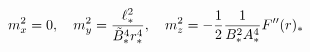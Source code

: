 \begin{equation}
m^{2}_{x}=0,\quad
m^{2}_{y}={\ell^{2}_{*}\over \tilde{B}^{4}_{*}r^{4}_{*}},\quad
m^{2}_{z}=-{1\over 2}{1\over B^{2}_{*}A^{4}_{*}}F''(r)_{*}
\label{eq:constmass}
\end{equation}


